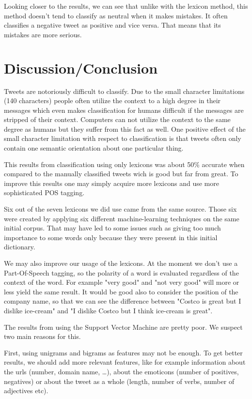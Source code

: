 \documentclass[a4paper,12pt]{report}
\begin{document}
Looking closer to the results, we can see that unlike with the lexicon method, this method doesn't tend to classify as neutral when it makes mistakes.
It often classifies a negative tweet as positive and vice versa.
That means that its mistakes are more serious.






\chapter{Discussion/Conclusion}
Tweets are notoriously difficult to classify. Due to the small character limitations (140 characters) people often utilize the context to a high degree in their messages which even makes classification for humans difficult if the messages are stripped of their context. Computers can not utilize the context to the same degree as humans but they suffer from this fact as well. One positive effect of the small character limitation with respect to classification is that tweets often only contain one semantic orientation about one particular thing.

This results from classification using only lexicons was about 50\% accurate when compared to the manually classified tweets wich is good but far from great. To improve this results one may simply acquire more lexicons and use more sophisticated POS tagging. 

Six out of the seven lexicons we did use came from the same source. Those six were created by applying six different machine-learning techniques on the same initial corpus. That may have led to some issues such as giving too much importance to some words only because they were present in this initial dictionary.

We may also improve our usage of the lexicons. At the moment we don't use a Part-Of-Speech tagging, so the polarity of a word is evaluated regardless of the context of the word. For example "very good" and "not very good" will more or less yield the same result. It would be good also to consider the position of the company name, so that we can see the difference between "Costco is great but I dislike ice-cream" and "I dislike Costco but I think ice-cream is great".

The results from using the Support Vector Machine are pretty poor. We suspect two main reasons for this.

First, using unigrams and bigrams as features may not be enough. To get better results, we should add more relevant features, like for example information about the urls (number, domain name, …), about the emoticons (number of positives, negatives) or about the tweet as a whole (length, number of verbs, number of adjectives etc).
\end{document}
